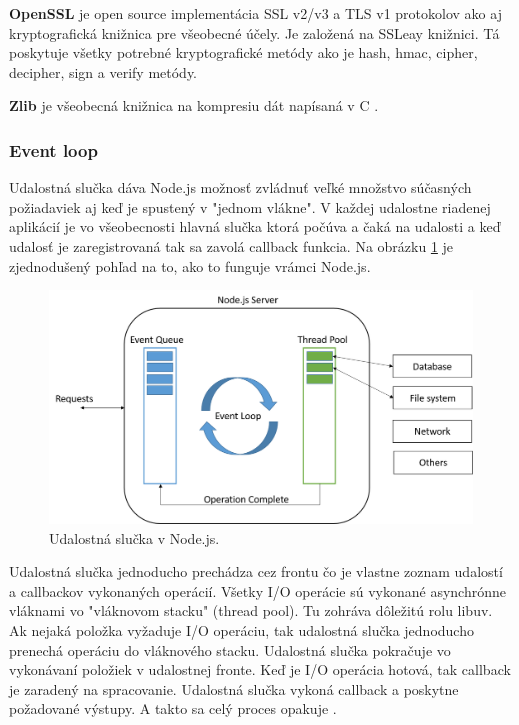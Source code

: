\textbf{OpenSSL} je open source implementácia SSL v2/v3 a TLS v1 protokolov ako aj kryptografická knižnica pre všeobecné účely. Je založená na SSLeay knižnici. Tá poskytuje všetky potrebné kryptografické metódy ako je hash, hmac, cipher, decipher, sign a verify metódy.

\textbf{Zlib} je všeobecná knižnica na kompresiu dát napísaná v C \cite{nodejs-arch}.


\subsubsection{Event loop}
Udalostná slučka dáva Node.js možnosť zvládnuť veľké množstvo súčasných požiadaviek aj keď je spustený v "jednom vlákne". V každej udalostne riadenej aplikácií je vo všeobecnosti hlavná slučka ktorá počúva a čaká na udalosti a keď udalosť je zaregistrovaná tak sa zavolá callback funkcia. Na obrázku \ref{img-node-event-loop} je zjednodušený pohľad na to, ako to funguje vrámci Node.js.

\begin{figure}[H]
  \centering
  \includegraphics[scale=0.6]{img/node/nodejs-event-loop.png}
  \caption{Udalostná slučka v Node.js.}
  \label{img-node-event-loop}
\end{figure}

Udalostná slučka jednoducho prechádza cez frontu čo je vlastne zoznam udalostí a callbackov vykonaných operácií. Všetky I/O operácie sú vykonané asynchrónne vláknami vo "vláknovom stacku" (thread pool). Tu zohráva dôležitú rolu libuv. Ak nejaká položka vyžaduje I/O operáciu, tak udalostná slučka jednoducho prenechá operáciu do vláknového stacku. Udalostná slučka pokračuje vo vykonávaní položiek v udalostnej fronte. Keď je I/O operácia hotová, tak callback je zaradený na spracovanie. Udalostná slučka vykoná callback a poskytne požadované výstupy. A takto sa celý proces opakuje \cite{nodejs-event-loop}.

